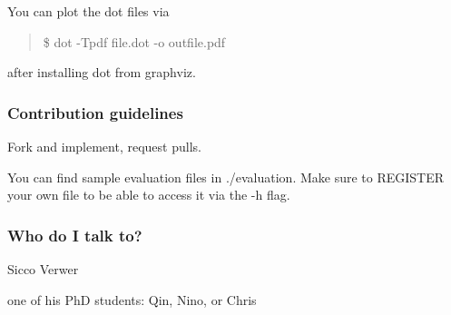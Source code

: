 You can plot the dot files via

\begin{quote}
\$ dot -\/\+Tpdf file.\+dot -\/o outfile.\+pdf \end{quote}


after installing dot from graphviz.

\subsubsection*{Contribution guidelines}


\begin{DoxyItemize}
\item Fork and implement, request pulls.
\item You can find sample evaluation files in ./evaluation. Make sure to R\+E\+G\+I\+S\+T\+ER your own file to be able to access it via the -\/h flag.
\end{DoxyItemize}

\subsubsection*{Who do I talk to?}


\begin{DoxyItemize}
\item Sicco Verwer
\item one of his PhD students\+: Qin, Nino, or Chris 
\end{DoxyItemize}